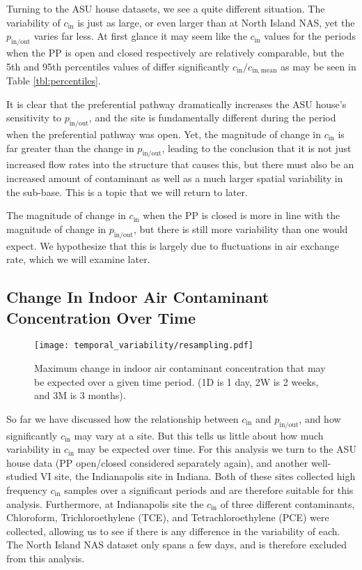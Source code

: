 \documentclass[journal=esthag,manuscript=article]{achemso}
\begin{document}
Turning to the ASU house datasets, we see a quite different situation.
The variability of $c_\mathrm{in}$ is just as large, or even larger than at North Island NAS, yet the $p_\mathrm{in/out}$ varies far less.
At first glance it may seem like the $c_\mathrm{in}$ values for the periods when the PP is open and closed respectively are relatively comparable, but the 5th and 95th percentiles values of differ significantly $c_\mathrm{in}/c_\mathrm{in,mean}$ as may be seen in Table \ref{tbl:percentiles}.

It is clear that the preferential pathway dramatically increases the ASU house's sensitivity to $p_\mathrm{in/out}$, and the site is fundamentally different during the period when the preferential pathway was open.
Yet, the magnitude of change in $c_\mathrm{in}$ is far greater than the change in $p_\mathrm{in/out}$, leading to the conclusion that it is not just increased flow rates into the structure that causes this, but there must also be an increased amount of contaminant as well as a much larger spatial variability in the sub-base.
This is a topic that we will return to later.

The magnitude of change in $c_\mathrm{in}$ when the PP is closed is more in line with the magnitude of change in $p_\mathrm{in/out}$, but there is still more variability than one would expect.
We hypothesize that this is largely due to fluctuations in air exchange rate, which we will examine later.

\subsection{Change In Indoor Air Contaminant Concentration Over Time} %

\begin{figure}[htb!]
  \centering
  \caption{Maximum change in indoor air contaminant concentration that may be expected over a given time period. (1D is 1 day, 2W is 2 weeks, and 3M is 3 months).}
  \label{fig:resampling}
  \texttt{[image: temporal\_variability/resampling.pdf]}
\end{figure}

So far we have discussed how the relationship between $c_\mathrm{in}$ and $p_\mathrm{in/out}$, and how significantly $c_\mathrm{in}$ may vary at a site.
But this tells us little about how much variability in $c_\mathrm{in}$ may be expected over time.
For this analysis we turn to the ASU house data (PP open/closed considered separately again), and another well-studied VI site, the Indianapolis site in Indiana.
Both of these sites collected high frequency $c_\mathrm{in}$ samples over a significant periods and are therefore suitable for this analysis\cite{u.s._environmental_protection_agency_assessment_2015,holton_temporal_2013}.
Furthermore, at Indianapolis site the $c_\mathrm{in}$ of three different contaminants, Chloroform, Trichloroethylene (TCE), and Tetrachloroethylene (PCE) were collected, allowing us to see if there is any difference in the variability of each.
The North Island NAS dataset only spans a few days, and is therefore excluded from this analysis.
\end{document}
